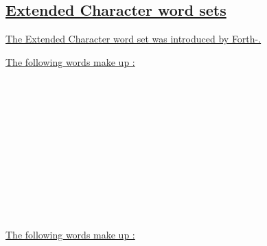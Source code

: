 \subsection[{Extended Character word sets}]{\uline{Extended Character word sets}}
\uline{The Extended Character word set was introduced by Forth-\snapshot.}

\uline{The following words make up :}

\begin{minipage}[t]{0.25\linewidth}
\uline{} \\
\uline{} \\
\uline{} \\
\uline{}
\end{minipage}
\hfill
\begin{minipage}[t]{0.25\linewidth}
\uline{} \\
\uline{} \\
\uline{} \\
\uline{}
\end{minipage}
\hfill
\begin{minipage}[t]{0.4\linewidth}
\uline{} \\
\uline{} \\
\uline{} \\
\uline{}
\end{minipage}

\uline{The following words make up :}

\begin{minipage}[t]{0.3\linewidth}
\uline{} \\
\uline{} \\
\uline{}
\end{minipage}
\hfill
\begin{minipage}[t]{0.3\linewidth}
\uline{} \\
\uline{} \\
\uline{}
\end{minipage}
\hfill
\begin{minipage}[t]{0.3\linewidth}
\uline{} \\
\uline{} \\
\uline{}
\end{minipage}

\cbend
